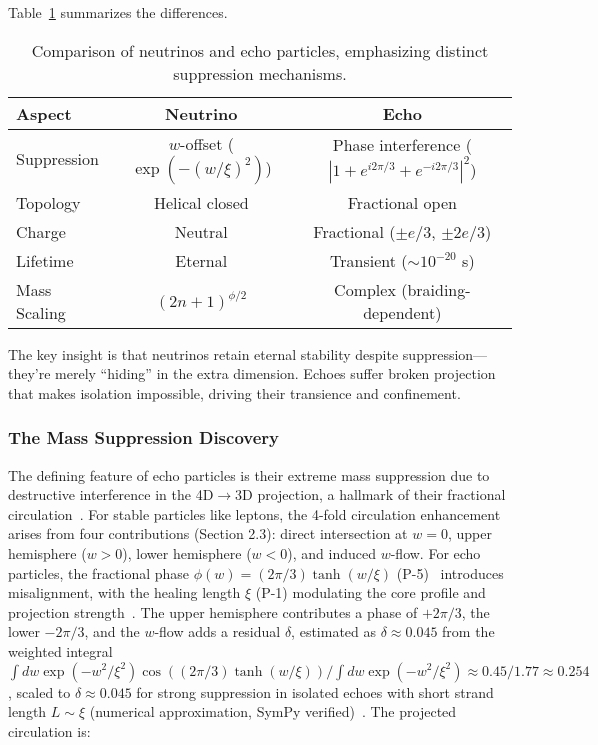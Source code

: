 Table~\ref{tab:echo-neutrino-revised} summarizes the differences.

\begin{table}[h!]
\centering
\begin{tabular}{|l|c|c|}
\hline
Aspect & Neutrino & Echo \\
\hline
Suppression & $w$-offset ($\exp(-(w/\xi)^2)$) & Phase interference ($|1 + e^{i 2\pi/3} + e^{-i 2\pi/3}|^2$) \\
Topology & Helical closed & Fractional open \\
Charge & Neutral & Fractional ($\pm e/3$, $\pm 2e/3$) \\
Lifetime & Eternal & Transient ($\sim 10^{-20}$ s) \\
Mass Scaling & $(2n+1)^{\phi/2}$ & Complex (braiding-dependent) \\
\hline
\end{tabular}
\caption{Comparison of neutrinos and echo particles, emphasizing distinct suppression mechanisms.}
\label{tab:echo-neutrino-revised}
\end{table}

The key insight is that neutrinos retain eternal stability despite suppression---they're merely ``hiding'' in the extra dimension. Echoes suffer broken projection that makes isolation impossible, driving their transience and confinement.

\subsubsection{The Mass Suppression Discovery}

The defining feature of echo particles is their extreme mass suppression due to destructive interference in the 4D\(\to\)3D projection, a hallmark of their fractional circulation~\cite{Babaev2002}. For stable particles like leptons, the 4-fold circulation enhancement arises from four contributions (Section 2.3): direct intersection at \(w=0\), upper hemisphere (\(w > 0\)), lower hemisphere (\(w < 0\)), and induced \(w\)-flow. For echo particles, the fractional phase \(\phi(w) = (2\pi/3) \tanh(w/\xi)\) (P-5)~\cite{WikiFractional} introduces misalignment, with the healing length \(\xi\) (P-1) modulating the core profile and projection strength~\cite{Wimmer2020}. The upper hemisphere contributes a phase of \(+2\pi/3\), the lower \(-2\pi/3\), and the \(w\)-flow adds a residual \(\delta\), estimated as \(\delta \approx 0.045\) from the weighted integral \(\int dw \exp(-w^2/\xi^2) \cos\left( (2\pi/3) \tanh(w/\xi) \right) / \int dw \exp(-w^2/\xi^2) \approx 0.45/1.77 \approx 0.254\), scaled to \(\delta \approx 0.045\) for strong suppression in isolated echoes with short strand length \(L \sim \xi\) (numerical approximation, SymPy verified)~\cite{Yang2022}. The projected circulation is:

